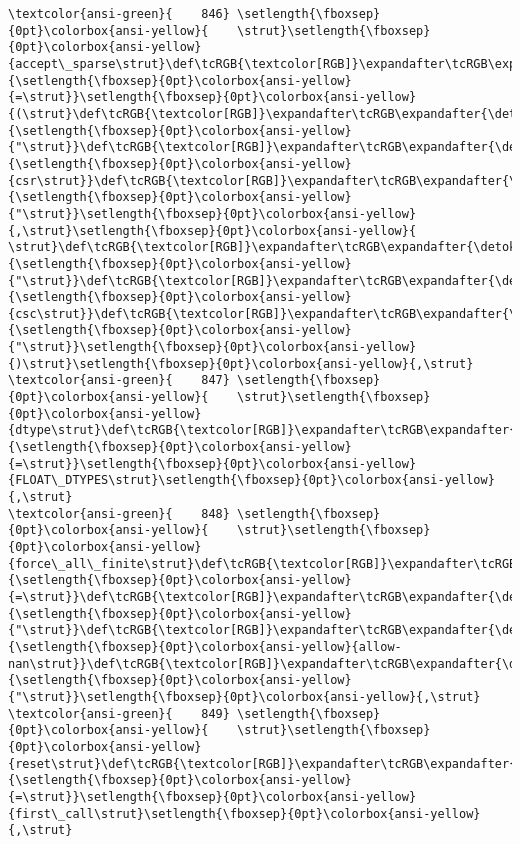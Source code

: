 \documentclass[11pt]{article}
\begin{document}
\begin{Verbatim}[commandchars=\\\{\}, frame=single, framerule=2mm, rulecolor=\color{outerrorbackground}]
\textcolor{ansi-green}{    846} \setlength{\fboxsep}{0pt}\colorbox{ansi-yellow}{    \strut}\setlength{\fboxsep}{0pt}\colorbox{ansi-yellow}{accept\_sparse\strut}\def\tcRGB{\textcolor[RGB]}\expandafter\tcRGB\expandafter{\detokenize{98,98,98}}{\setlength{\fboxsep}{0pt}\colorbox{ansi-yellow}{=\strut}}\setlength{\fboxsep}{0pt}\colorbox{ansi-yellow}{(\strut}\def\tcRGB{\textcolor[RGB]}\expandafter\tcRGB\expandafter{\detokenize{175,0,0}}{\setlength{\fboxsep}{0pt}\colorbox{ansi-yellow}{"\strut}}\def\tcRGB{\textcolor[RGB]}\expandafter\tcRGB\expandafter{\detokenize{175,0,0}}{\setlength{\fboxsep}{0pt}\colorbox{ansi-yellow}{csr\strut}}\def\tcRGB{\textcolor[RGB]}\expandafter\tcRGB\expandafter{\detokenize{175,0,0}}{\setlength{\fboxsep}{0pt}\colorbox{ansi-yellow}{"\strut}}\setlength{\fboxsep}{0pt}\colorbox{ansi-yellow}{,\strut}\setlength{\fboxsep}{0pt}\colorbox{ansi-yellow}{ \strut}\def\tcRGB{\textcolor[RGB]}\expandafter\tcRGB\expandafter{\detokenize{175,0,0}}{\setlength{\fboxsep}{0pt}\colorbox{ansi-yellow}{"\strut}}\def\tcRGB{\textcolor[RGB]}\expandafter\tcRGB\expandafter{\detokenize{175,0,0}}{\setlength{\fboxsep}{0pt}\colorbox{ansi-yellow}{csc\strut}}\def\tcRGB{\textcolor[RGB]}\expandafter\tcRGB\expandafter{\detokenize{175,0,0}}{\setlength{\fboxsep}{0pt}\colorbox{ansi-yellow}{"\strut}}\setlength{\fboxsep}{0pt}\colorbox{ansi-yellow}{)\strut}\setlength{\fboxsep}{0pt}\colorbox{ansi-yellow}{,\strut}
\textcolor{ansi-green}{    847} \setlength{\fboxsep}{0pt}\colorbox{ansi-yellow}{    \strut}\setlength{\fboxsep}{0pt}\colorbox{ansi-yellow}{dtype\strut}\def\tcRGB{\textcolor[RGB]}\expandafter\tcRGB\expandafter{\detokenize{98,98,98}}{\setlength{\fboxsep}{0pt}\colorbox{ansi-yellow}{=\strut}}\setlength{\fboxsep}{0pt}\colorbox{ansi-yellow}{FLOAT\_DTYPES\strut}\setlength{\fboxsep}{0pt}\colorbox{ansi-yellow}{,\strut}
\textcolor{ansi-green}{    848} \setlength{\fboxsep}{0pt}\colorbox{ansi-yellow}{    \strut}\setlength{\fboxsep}{0pt}\colorbox{ansi-yellow}{force\_all\_finite\strut}\def\tcRGB{\textcolor[RGB]}\expandafter\tcRGB\expandafter{\detokenize{98,98,98}}{\setlength{\fboxsep}{0pt}\colorbox{ansi-yellow}{=\strut}}\def\tcRGB{\textcolor[RGB]}\expandafter\tcRGB\expandafter{\detokenize{175,0,0}}{\setlength{\fboxsep}{0pt}\colorbox{ansi-yellow}{"\strut}}\def\tcRGB{\textcolor[RGB]}\expandafter\tcRGB\expandafter{\detokenize{175,0,0}}{\setlength{\fboxsep}{0pt}\colorbox{ansi-yellow}{allow-nan\strut}}\def\tcRGB{\textcolor[RGB]}\expandafter\tcRGB\expandafter{\detokenize{175,0,0}}{\setlength{\fboxsep}{0pt}\colorbox{ansi-yellow}{"\strut}}\setlength{\fboxsep}{0pt}\colorbox{ansi-yellow}{,\strut}
\textcolor{ansi-green}{    849} \setlength{\fboxsep}{0pt}\colorbox{ansi-yellow}{    \strut}\setlength{\fboxsep}{0pt}\colorbox{ansi-yellow}{reset\strut}\def\tcRGB{\textcolor[RGB]}\expandafter\tcRGB\expandafter{\detokenize{98,98,98}}{\setlength{\fboxsep}{0pt}\colorbox{ansi-yellow}{=\strut}}\setlength{\fboxsep}{0pt}\colorbox{ansi-yellow}{first\_call\strut}\setlength{\fboxsep}{0pt}\colorbox{ansi-yellow}{,\strut}

\end{Verbatim}
\end{document}
